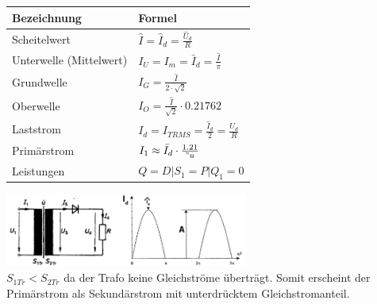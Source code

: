	\begin{minipage}[c]{10cm}  
		\begin{tabular}{| l | l |}
    		\hline 
      		\textbf{Bezeichnung}
      		& \textbf{Formel} \\
      		\hline
      		Scheitelwert 
      		& $\hat{I} = \hat{I}_d = \frac{\hat{U}_d}{R} $ \\
      		Unterwelle (Mittelwert)
      		& $I_U = I_m = \bar{I}_d  = \frac{\hat{I}}{\pi}$ \\
      		Grundwelle
      		& $I_G = \frac{\hat{I}}{2 \cdot \sqrt{2}}$ \\
      		Oberwelle
      		& $I_O = \frac{\hat{I}}{\sqrt{2}} \cdot 0.21762$ \\
      		Laststrom
      		& $I_{d} = I_{TRMS} =\frac{\hat{I}_d}{2} = \frac{U_d}{R}$ \\
      		Prim\"arstrom
      		& $I_1 \approx \bar{I}_d \cdot \frac{1.21}{"u}$ \\
      		Leistungen
      		& $Q = D | S_1 = P | Q_1 = 0$ \\
      		\hline 
    	\end{tabular}
	\end{minipage}   
	\begin{minipage}[c]{8cm}  
			\includegraphics[width=8cm]{bilder/EinwegGR.png}  \\			
	$S_{1Tr} < S_{2Tr}$ da der Trafo keine Gleichstr\"ome übertr\"agt. Somit erscheint der Prim\"arstrom
	als Sekund\"arstrom mit unterdrücktem Gleichstromanteil.\\			
	\end{minipage}

